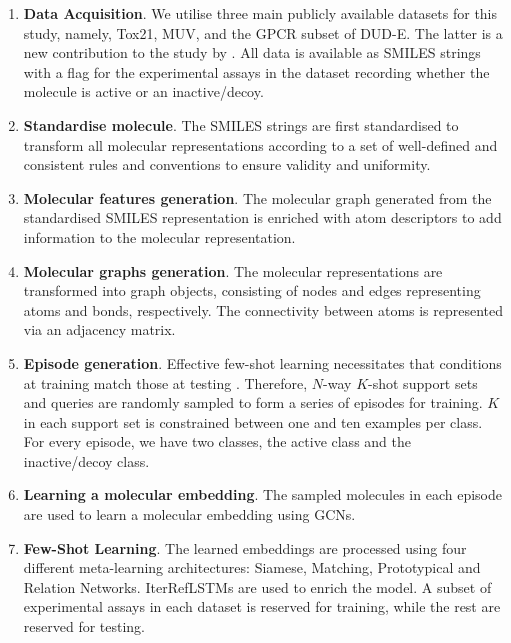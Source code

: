 \begin{enumerate}
    \item \textbf{Data Acquisition}. We utilise three main publicly available datasets for this study, namely, Tox21, MUV, and the GPCR subset of DUD-E. The latter is a new contribution to the study by \citet{altae2017low}. All data is available as SMILES strings with a flag for the experimental assays in the dataset recording whether the molecule is active or an inactive/decoy.

    \item \textbf{Standardise molecule}. The SMILES strings are first standardised to transform all molecular representations according to a set of well-defined and consistent rules and conventions to ensure validity and uniformity.

    \item \textbf{Molecular features generation}. The molecular graph generated from the standardised SMILES representation is enriched with atom descriptors to add information to the molecular representation.

    \item \textbf{Molecular graphs generation}. The molecular representations are transformed into graph objects, consisting of nodes and edges representing atoms and bonds, respectively. The connectivity between atoms is represented via an adjacency matrix.

    \item \textbf{Episode generation}. Effective few-shot learning necessitates that conditions at training match those at testing \citep{vinyals2016matching}. Therefore, $N$-way $K$-shot support sets and queries are randomly sampled to form a series of episodes for training. $K$ in each support set is constrained between one and ten examples per class. For every episode, we have two classes, the active class and the inactive/decoy class.

    \item \textbf{Learning a molecular embedding}. The sampled molecules in each episode are used to learn a molecular embedding using GCNs.

    \item \textbf{Few-Shot Learning}. The learned embeddings are processed using four different meta-learning architectures: Siamese, Matching, Prototypical and Relation Networks. IterRefLSTMs \citep{altae2017low} are used to enrich the model. A subset of experimental assays in each dataset is reserved for training, while the rest are reserved for testing.


\end{enumerate}
